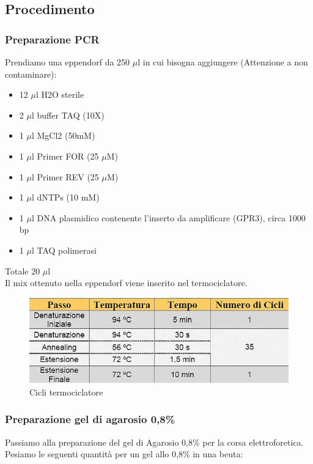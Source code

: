 \subsection{Procedimento}

\subsubsection{Preparazione PCR}

Prendiamo una eppendorf da 250 $\mu$l in cui bisogna aggiungere (Attenzione a non contaminare):
\begin{itemize}
	\item 12 $\mu$l H2O sterile
	\item 2 $\mu$l buffer TAQ (10X)
	\item 1 $\mu$l MgCl2 (50mM)
	\item 1 $\mu$l Primer FOR (25 $\mu$M)
	\item 1 $\mu$l Primer REV (25 $\mu$M)
	\item 1 $\mu$l dNTPs (10 mM)
	\item 1 $\mu$l DNA plasmidico contenente l’inserto da amplificare (GPR3), circa 1000 bp
	\item 1 $\mu$l TAQ polimerasi
\end{itemize}

Totale 20 $\mu$l\\

Il mix ottenuto nella eppendorf
viene inserito nel termociclatore.
\begin{figure}
	\includegraphics{./immagini/cicli_termociclatore.jpg}
	\caption{Cicli termociclatore}
	\label{cicli_termociclatore}
\end{figure}

\subsubsection{Preparazione gel di agarosio 0,8\%}

Passiamo alla preparazione del gel di Agarosio 0,8\% per la corsa elettroforetica.
Pesiamo le seguenti quantità per un gel allo 0,8\% in una beuta:

